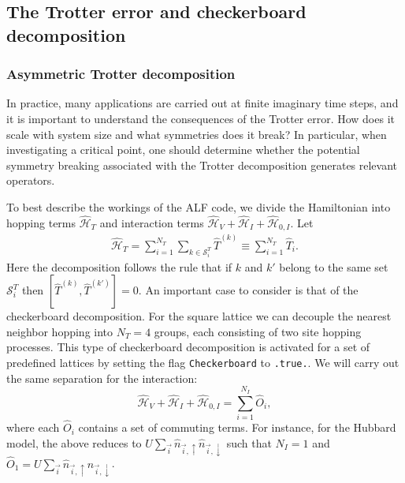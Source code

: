 %



\subsection{The Trotter error and  checkerboard  decomposition }\label{sec:trotter}
%

\subsubsection{Asymmetric  Trotter decomposition}
In practice, many applications are carried out at finite  imaginary time steps,  and it is important to  understand the consequences of the Trotter error.
How does it scale with system size and  what  symmetries  does it break?
In particular, when investigating a critical point, one should determine whether the potential symmetry breaking  associated  with the Trotter decomposition generates relevant operators.

To best describe the workings of the ALF  code,  we divide the Hamiltonian into  hopping terms  $\hat{\mathcal{H}}_{T}$  and interaction terms  
$\hat{\mathcal{H}}_{V} +  \hat{\mathcal{H}}_{I}   +   \hat{\mathcal{H}}_{0,I} $.       Let 
\begin{align}
\label{Checkerboard.Eq}
	\hat{\mathcal{H}}_{T}     = \sum_{i=1}^{N_T} \sum_{k \in \mathcal{S}^{T}_i} \hat{T}^{(k)}  \equiv \sum_{i=1}^{N_T} \hat{T}_{i}.
\end{align}
Here the decomposition follows the rule  that if $k$ and $k'$  belong to the same set $\mathcal{S}^{T}_i $ then   $ \left[ \hat{T}^{(k)} , \hat{T}^{(k')} \right] = 0 $.  An important case to consider is that of the checkerboard decomposition.
For the square lattice we can decouple the nearest neighbor hopping  into $N_T=4$ groups,  each consisting of two site hopping processes.
This type of checkerboard decomposition is activated for a set  of predefined lattices by setting the flag  \texttt{Checkerboard} to \texttt{.true.}.
We will carry out the same separation for the interaction: 
\begin{equation}
\label{Checkerboard_V.Eq}
	\hat{\mathcal{H}}_{V}  +  \hat{\mathcal{H}}_{I}   +   \hat{\mathcal{H}}_{0,I}   = \sum_{i=1}^{N_I}  \hat{O}_{i},
\end{equation}
where each $\hat{O}_{i}$  contains a set of commuting terms.  For instance, for the Hubbard model,   the  above reduces to 
$U \sum_{\vec{i}}  \hat{n}_{\vec{i},\uparrow } \hat{n}_{\vec{i},\downarrow }  $    such that $N_I = 1$ and   $ \hat{O}_{1} = U \sum_{\vec{i}}  \hat{n}_{\vec{i},\uparrow } \hat{n}_{\vec{i},\downarrow }   $. 

